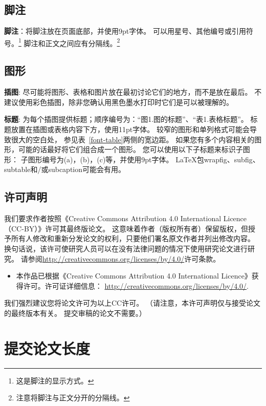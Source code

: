 \documentclass[11pt]{article}
\begin{document}
\begin{CJK*}{UTF8}{gbsn}
\subsection{脚注}

{\bf 脚注}：将脚注放在页面底部，并使用9pt字体。
可以用星号、其他编号或引用符号。\footnote{这是脚注的显示方式。}
脚注和正文之间应有分隔线。\footnote {注意将脚注与正文分开的分隔线。}

\subsection{图形}

{\bf 插图}:
尽可能将图形、表格和图片放在最初讨论它们的地方，而不是放在最后。
不建议使用彩色插图，除非您确认用黑色墨水打印时它们是可以被理解的。

{\bf 标题}: 
为每个插图提供标题；顺序编号为：“图1.图的标题”、“表1.表格标题”。
标题放置在插图或表格内容下方，使用11pt字体。
较窄的图形和单列格式可能会导致很大的空白处，
参见表~\ref{font-table}两侧的宽边距。
如果您有多个内容相关的图形，可能的话最好将它们组合成一个图形。
您可以使用以下子标题来标识子图形：
子图形编号为(a)，(b)，(c)等，并使用9pt字体。
\LaTeX{}包wrapfig、subfig、subtable和/或subcaption可能会有用。

\subsection{许可声明}
\label{licence}

我们要求作者按照《Creative Commons Attribution 4.0 International Licence（CC-BY）》许可其最终版论文。
这意味着作者（版权所有者）保留版权，但授予所有人修改和重新分发论文的权利，只要他们署名原文作者并列出修改内容。
换句话说，该许可使研究人员可以在没有法律问题的情况下使用研究论文进行研究。
请参阅\url{http://creativecommons.org/licenses/by/4.0/}许可条款。

\begin{itemize}
    \item 本作品已根据《Creative Commons Attribution 4.0 International Licence》获得许可。许可证详细信息：
    \url{http://creativecommons.org/licenses/by/4.0/}.
\end{itemize}

我们强烈建议您将论文许可为以上CC许可。 （请注意，本许可声明仅与接受论文的最终版本有关。
提交审稿的论文不需要。）

\section{提交论文长度}
\label{sec:length}


\end{CJK*}
\end{document}
